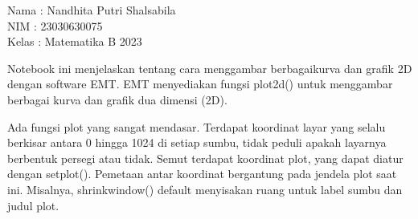 \documentclass{article}
\begin{document}
\begin{eulernotebook}
\begin{eulercomment}
Nama : Nandhita Putri Shalsabila\\
NIM : 23030630075\\
Kelas : Matematika B 2023

\end{eulercomment}
\begin{eulercomment}
Notebook ini menjelaskan tentang cara menggambar berbagaikurva dan
grafik 2D dengan software EMT. EMT menyediakan fungsi plot2d() untuk
menggambar berbagai kurva dan grafik dua dimensi (2D).\\
\end{eulercomment}
\begin{eulercomment}
Ada fungsi plot yang sangat mendasar. Terdapat koordinat layar yang
selalu berkisar antara 0 hingga 1024 di setiap sumbu, tidak peduli
apakah layarnya berbentuk persegi atau tidak. Semut terdapat koordinat
plot, yang dapat diatur dengan setplot(). Pemetaan antar koordinat
bergantung pada jendela plot saat ini. Misalnya, shrinkwindow()
default menyisakan ruang untuk label sumbu dan judul plot.


\end{eulercomment}
\end{eulernotebook}
\end{document}
